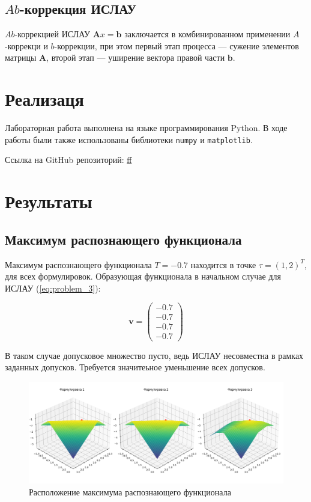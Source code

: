 \documentclass{article}
\begin{document}
\subsection{\( Ab \)-коррекция ИСЛАУ}

  \( Ab \)-коррекцией ИСЛАУ \( \mathbf{A}x = \mathbf{b} \) заключается
  в комбинированном применении \( A \)-коррекци и \( b \)-коррекции,
  при этом первый этап процесса --- сужение элементов матрицы
  \( \mathbf{A} \), второй этап --- уширение вектора правой части
  \( \mathbf{b} \).

  \section{Реализаця}

  Лабораторная работа выполнена на языке программирования Python. В ходе
  работы были также использованы библиотеки \verb!numpy! и
  \verb!matplotlib!.

  Ссылка на GitHub репозиторий:
  \url{ff}

  \section{Результаты}

  \subsection{Максимум распознающего функционала}

  Максимум распознающего функционала \( T = -0.7 \) находится в точке
  \( \tau = (1, 2)^T \), для всех формулировок. Образующая функционала в
  начальном случае для ИСЛАУ (\ref{eq:problem_3}):

  \begin{equation}
    \mathbf{v} = \begin{pmatrix}
      -0.7 \\
      -0.7 \\
      -0.7 \\
      -0.7
    \end{pmatrix}
  \end{equation}

  В таком случае допусковое множество пусто, ведь ИСЛАУ несовместна в рамках заданных допусков.
  Требуется значитеьное уменьшение всех допусков.
    \begin{figure}[htbp!]
        \begin{center}
            \includegraphics[width = \textwidth]{tol}
            \caption{Расположение максимума распознающего функционала}
    \label{figure:tol}
        \end{center}
    \end{figure}
\end{document}
